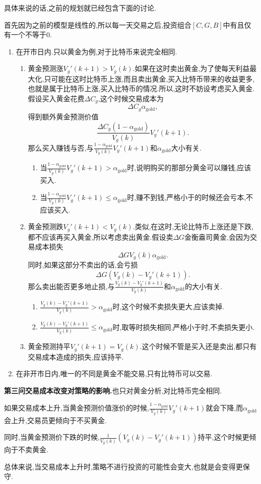 \documentclass[12pt,a4paper,oneside]{ctexart}
\begin{document}
具体来说的话,之前的规划就已经包含下面的讨论.

首先因为之前的模型是线性的,所以每一天交易之后,投资组合$[C,G,B]$中有且仅有一个不等于0.

\begin{enumerate}
    \item 在开市日内.只以黄金为例,对于比特币来说完全相同.\begin{enumerate}
            \item 黄金预测涨$V_g'(k+1)>V_g(k)$.如果在这时卖出黄金,为了使每天利益最大化,只可能在这时比特币上涨,而且卖出黄金,买入比特币带来的收益更多,也就是属于比特币上涨,买入比特币的情况.所以,这时不妨设考虑买入黄金.假设买入黄金花费$\Delta C_g$,这个时候交易成本为
            $$\Delta C_g\alpha_{\mathrm{gold}},$$
            得到额外黄金预测价值
            $$\frac{\Delta C_g(1-\alpha_{\mathrm{gold}})}{V_g(k)}V_g'(k+1).$$
            那么买入赚钱与否,与$\frac{1-\alpha_{\mathrm{gold}}}{V_g(k)}V_g'(k+1)$和$\alpha_{\mathrm{gold}}$大小有关.
            \begin{enumerate}
                \item 当$\frac{1-\alpha_{\mathrm{gold}}}{V_g(k)}V_g'(k+1)>\alpha_{\mathrm{gold}}$时,说明购买的那部分黄金可以赚钱,应该买入.
                \item 当$\frac{1-\alpha_{\mathrm{gold}}}{V_g(k)}V_g'(k+1)\leqslant\alpha_{\mathrm{gold}}$时,赚不到钱,严格小于的时候还会亏本,不应该买入.
            \end{enumerate}
            \item 黄金预测跌$V_g'(k+1)<V_g(k)$.类似,在这时,无论比特币上涨还是下跌,都不应该再买入黄金,所以考虑卖出黄金.假设卖$\Delta G$金衡盎司黄金,会因为交易成本损失\begin{equation*}
                \Delta GV_g(k)\alpha_{\mathrm{gold}}.
            \end{equation*}
            同时,如果这部分不卖出的话,会亏损
            \begin{equation*}
                \Delta G(V_g(k)-V_g'(k+1)).
            \end{equation*}
            那么卖出能否更多地止损,与$\frac{V_g(k)-V_g'(k+1)}{V_g(k)}$和$\alpha_{\mathrm{gold}}$的大小有关.
            \begin{enumerate}
                \item $\frac{V_g(k)-V_g'(k+1)}{V_g(k)}>\alpha_{\mathrm{gold}}$时,这个时候不卖损失更大,应该卖掉.
                \item $\frac{V_g(k)-V_g'(k+1)}{V_g(k)}\leqslant\alpha_{\mathrm{gold}}$时,取等时损失相同,严格小于时,不卖损失更小.
            \end{enumerate}
            \item 黄金预测持平$V_g'(k+1)=V_g(k)$.这个时候不管是买入还是卖出,都只有交易成本造成的损失,应该持平.
        \end{enumerate}
    \item 在非开市日内,唯一的不同是黄金不能交易,只有比特币可以交易.
\end{enumerate}

\textbf{第三问交易成本改变对策略的影响.}也只对黄金分析,对比特币完全相同.

如果交易成本上升,当黄金预测价值涨价的时候,$\frac{1-\alpha_{\mathrm{gold}}}{V_g(k)}V_g'(k+1)$就会下降,而$\alpha_{\mathrm{gold}}$会上升,交易员更倾向于不买黄金.

同时,当黄金预测价下跌的时候,$\frac{1}{V_g(k)}\left(V_g(k)-V_g'(k+1)\right)$持平,这个时候更倾向于不卖黄金.

总体来说,当交易成本上升时,策略不进行投资的可能性会变大,也就是会变得更保守.
\end{document}
